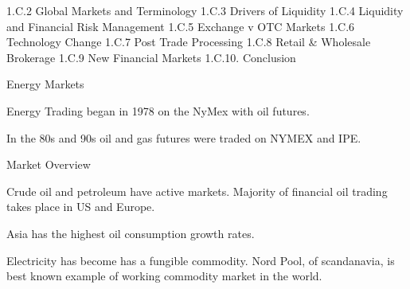 1.C.2 Global Markets and Terminology
1.C.3 Drivers of Liquidity
1.C.4 Liquidity and Financial Risk Management
1.C.5 Exchange v OTC Markets
1.C.6 Technology Change
1.C.7 Post Trade Processing
1.C.8 Retail \& Wholesale Brokerage
1.C.9 New Financial Markets
1.C.10. Conclusion


Energy Markets

Energy Trading began in 1978 on the NyMex with oil futures.

In the 80s and 90s oil and gas futures were traded on NYMEX and IPE.

Market Overview

Crude oil and petroleum have active markets. Majority of financial oil trading takes place in US and Europe.

Asia has the highest oil consumption growth rates.

Electricity has become has a fungible commodity. Nord Pool, of scandanavia, is best known example of working commodity market in the world.
